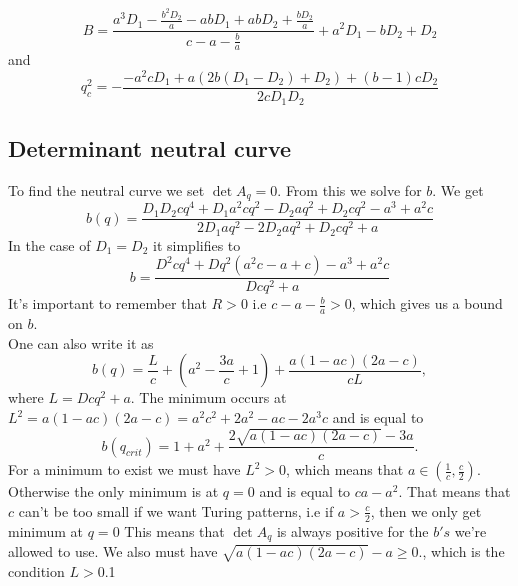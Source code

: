 \documentclass{article}
\begin{document}
\begin{equation}
B = \frac{a^3 D_1-\frac{b^2 D_2}{a}-a b D_1+a b D_2+\frac{b D_2}{a}}{c-a-\frac{b}{a}}+a^2 D_1-b D_2+D_2
\end{equation}
and 
\begin{equation}
q_{c}^2 = -\frac{-a^2 c D_1+a (2 b (D_1-D_2)+D_2)+(b-1) c D_2}{2 c D_1 D_2}
\end{equation}
\subsection{Determinant neutral curve}
To find the neutral curve we set 
$\det A_q = 0$. From this we solve for $b$. 
We get
\begin{equation}
b(q)=\frac{D_1 D_2 c q^4 + D_1 a^2 c q^2 - D_2 a q^2 + D_2 c q^2 - a^3 + a^2 c}{2 D_1 a q^2 - 2 D_2 a q^2 + D_2 c q^2 + a}
\end{equation}
In the case of $D_1=D_2$ it simplifies to
\begin{equation}
b=\frac{D^2 c q^4 +Dq^2(  a^2 c  -  a  +  c ) - a^3 + a^2 c}{D c q^2 + a} 
\end{equation}
It's important to remember that $R>0$ i.e $c-a-\frac{b}{a}>0$, which gives us a bound on $b$.\\
One can also write it as
\begin{equation}
b(q) = \frac{L}{c}+ (a^2-\frac{3a}{c}+1)+\frac{a(1-ac)(2a-c)}{cL},
\end{equation}
where $L= Dcq^2 + a$. The minimum occurs at $L^2 = a(1-ac)(2a-c) = a^2c^2+2a^2-ac-2a^3c$ and is equal to 
\begin{equation}
b(q_{crit}) = 1+a^2 + \frac{2\sqrt{a(1-ac)(2a-c)}-3a}{c}.
\end{equation}
For a minimum to exist we must have $L^2>0$, which means that $a \in (\frac{1}{c}, \frac{c}{2})$. Otherwise the only minimum is at $q=0$ and is equal to $ca-a^2$. That means that $c$ can't be too small if we want Turing patterns, i.e if $a>\frac{c}{2}$, then we only get minimum at $q=0$ This means that $\det A_q$ is always positive for the $b's$ we're allowed to use. We also must have $\sqrt{a(1-ac)(2a-c)}-a\geq 0.$, which is the condition $L>0$.1
\end{document}
